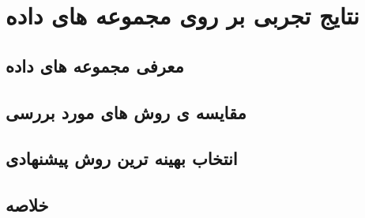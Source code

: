 \chapter{نتایج تجربی بر روی مجموعه های داده}

\section{معرفی مجموعه های داده}

\section{مقایسه ی روش های مورد بررسی}
\section{انتخاب بهینه ترین روش پیشنهادی}
\section{خلاصه}

